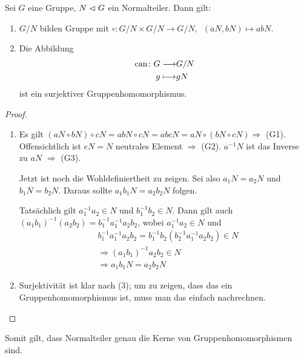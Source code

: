 \documentclass[12pt,a4paper]{scrartcl}
\begin{document}

\begin{satz} \label{thm:nt}
	Sei $G$ eine Gruppe, $N\vartriangleleft G$ ein Normalteiler. Dann gilt:
	\begin{enumerate}
		\item $G/N$ bilden Gruppe mit $\circ\colon G/N\times G/N \to G/N,\enspace (aN, bN)\mapsto abN$.
		\item Die Abbildung 
		\begin{eqnarray*}
			\operatorname{can}\colon G \longrightarrow& G/N\\
			g \longmapsto& gN
		\end{eqnarray*}
	ist ein surjektiver Gruppenhomomorphismus.
	\end{enumerate}
\end{satz}

\begin{proof}
	\leavevmode
	\begin{enumerate}
		\item Es gilt $(aN\circ bN)\circ cN = abN\circ cN = abc N = aN\circ (bN\circ cN) \Rightarrow$ (G1).
		Offensichtlich ist $eN = N$ neutrales Element $\Rightarrow$ (G2).
		$a^{-1}N$ ist das Inverse zu $aN$ $\Rightarrow$ (G3).
		
		Jetzt ist noch die Wohldefiniertheit zu zeigen. Sei also $a_1N = a_2N$ und $b_1N = b_2N$. Daraus sollte $a_1b_1N = a_2b_2N$ folgen.
		
		Tatsächlich gilt $a_1^{-1}a_2 \in N$ und $b_1^{-1}b_2\in N$. Dann gilt auch $(a_1b_1)^{-1}(a_2b_2) = b_1^{-1}a_1^{-1} a_2b_2$, wobei $a_1^{-1}a_2\in N$ und 
		\begin{align*}
		&b_1^{-1}a_1^{-1} a_2b_2 = b_1^{-1}b_2(b_2^{-1}a_1^{-1}a_2b_2)\in N \\
		&\Rightarrow (a_1b_1)^{-1}a_2b_2\in N \\
		&\Rightarrow a_1b_1N = a_2b_2N
		\end{align*}
		
		
		\item Surjektivität ist klar nach (3); um zu zeigen, dass das ein Gruppenhomomorphismus ist, muss man das einfach nachrechnen.
	\end{enumerate}
\end{proof}

\begin{bem}
	Somit gilt, dass Normalteiler genau die Kerne von Gruppenhomomorphismen sind.
\end{bem}
\end{document}

